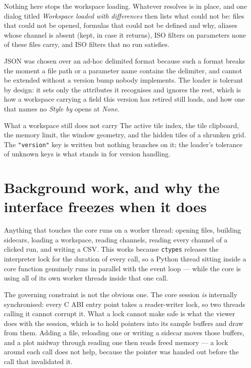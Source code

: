 \documentclass[11pt,a4paper,oneside]{report}
\newcommand{\code}[1]{\texttt{#1}}
\begin{document}
Nothing here stops the workspace loading. Whatever resolves is in place, and one
dialog titled \emph{Workspace loaded with differences} then lists what could not
be: files that could not be opened, formulas that could not be defined and why,
aliases whose channel is absent (kept, in case it returns), ISO filters on
parameters none of these files carry, and ISO filters that no run satisfies.

JSON was chosen over an ad-hoc delimited format because such a format breaks the
moment a file path or a parameter name contains the delimiter, and cannot be
extended without a version bump nobody implements. The loader is tolerant by
design: it sets only the attributes it recognises and ignores the rest, which
is how a workspace carrying a field this version has retired still loads, and
how one that names no \emph{Style by} opens at \emph{None}.

\begin{aoenote}{What a workspace still does not carry}
The active tile index, the tile clipboard, the memory limit, the window geometry,
and the hidden tiles of a shrunken grid. The \code{"version"} key is written but
nothing branches on it; the loader's tolerance of unknown keys is what stands in
for version handling.
\end{aoenote}

\section{Background work, and why the interface freezes when it does}

Anything that touches the core runs on a worker thread: opening files, building
sidecars, loading a workspace, reading channels, reading every channel of a
clicked run, and writing a CSV. This works because \code{ctypes} releases the
interpreter lock for the duration of every call, so a Python thread sitting
inside a core function genuinely runs in parallel with the event loop --- while
the core is using all of its own worker threads inside that one call.

The governing constraint is not the obvious one. The core session \emph{is}
internally synchronised: every C ABI entry point takes a reader-writer lock, so
two threads calling it cannot corrupt it. What a lock cannot make safe is what
the viewer does with the session, which is to hold pointers into its sample
buffers and draw from them. Adding a file, reloading one or writing a sidecar
moves those buffers, and a plot midway through reading one then reads freed
memory --- a lock around each call does not help, because the pointer was handed
out before the call that invalidated it.
\end{document}
